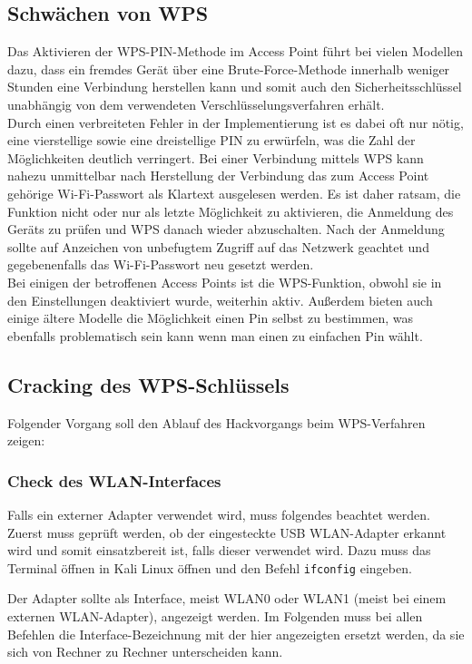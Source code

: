 \subsection{Schwächen von WPS}

Das Aktivieren der WPS-PIN-Methode im Access Point führt bei vielen Modellen dazu, dass ein fremdes Gerät über eine Brute-Force-Methode innerhalb weniger Stunden eine Verbindung herstellen kann und somit auch den Sicherheitsschlüssel unabhängig von dem verwendeten Verschlüsselungsverfahren erhält. \\
Durch einen verbreiteten Fehler in der Implementierung ist es dabei oft nur nötig, eine vierstellige sowie eine dreistellige PIN zu erwürfeln, was die Zahl der Möglichkeiten deutlich verringert. Bei einer Verbindung mittels WPS kann nahezu unmittelbar nach Herstellung der Verbindung das zum Access Point gehörige Wi-Fi-Passwort als Klartext ausgelesen werden. Es ist daher ratsam, die Funktion nicht oder nur als letzte Möglichkeit zu aktivieren, die Anmeldung des Geräts zu prüfen und WPS danach wieder abzuschalten. Nach der Anmeldung sollte auf Anzeichen von unbefugtem Zugriff auf das Netzwerk geachtet und gegebenenfalls das Wi-Fi-Passwort neu gesetzt werden. \\
Bei einigen der betroffenen Access Points ist die WPS-Funktion, obwohl sie in den Einstellungen deaktiviert wurde, weiterhin aktiv. Außerdem bieten auch einige ältere Modelle die Möglichkeit einen Pin selbst zu bestimmen, was ebenfalls problematisch sein kann wenn man einen zu einfachen Pin wählt.

\subsection{Cracking des WPS-Schlüssels}
Folgender Vorgang soll den Ablauf des Hackvorgangs beim WPS-Verfahren zeigen:

\subsubsection{Check des WLAN-Interfaces}
	Falls ein externer Adapter verwendet wird, muss folgendes beachtet werden. Zuerst muss geprüft werden, ob der eingesteckte USB WLAN-Adapter erkannt wird und somit einsatzbereit ist, falls dieser verwendet wird. Dazu muss das Terminal öffnen in Kali Linux öffnen und den Befehl \colorbox{altgray}{\lstinline|ifconfig|} eingeben.

	\noindent Der Adapter sollte als Interface, meist WLAN0 oder WLAN1 (meist bei einem externen WLAN-Adapter), angezeigt werden. Im Folgenden muss bei allen Befehlen die Interface-Bezeichnung mit der hier angezeigten ersetzt werden, da sie sich von Rechner zu Rechner unterscheiden kann.

